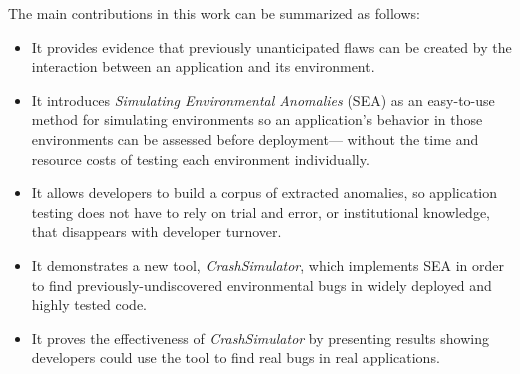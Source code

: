 The main contributions in this work can be summarized as follows:

\begin{itemize}

\item{It provides evidence
that previously unanticipated flaws can be created by the interaction
between an application and its environment.}

\item{It introduces \textit{Simulating Environmental Anomalies} (SEA)
as an easy-to-use method for simulating environments
so an application's behavior in those environments
can be assessed before deployment---
without the time and resource costs of
testing each environment individually.}

\item{It allows developers to build a corpus of extracted anomalies, so
    application testing does not have to rely on trial and error,
    or institutional knowledge,
    that disappears with developer turnover.}

\item{It demonstrates a new tool, {\em CrashSimulator},
which implements SEA
in order to find previously-undiscovered environmental bugs
in widely deployed and highly tested code.}

\item{It proves the effectiveness
of {\em CrashSimulator}
by presenting results
showing developers
could use the tool to find real bugs in real applications.}

\end{itemize}
